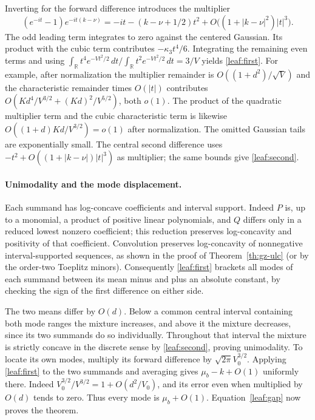 \documentclass[11pt,a4paper]{article}
\numberwithin{equation}{section}
\begin{document}
Inverting for the forward difference introduces the multiplier
\[
 (e^{-it}-1)e^{-it(k-\nu)}
 =-it-(k-\nu+1/2)t^2+O\big((1+|k-\nu|^2)|t|^3\big).
\]
The odd leading term integrates to zero against the centered
Gaussian. Its product with the cubic term contributes
$-\kappa_3t^4/6$. Integrating the remaining even terms and using
$\int_{\mathbb R}t^4 e^{-Vt^2/2}\,dt/
\int_{\mathbb R}t^2 e^{-Vt^2/2}\,dt=3/V$ yields
\eqref{leaf:first}. For example, after normalization the multiplier
remainder is $O((1+d^2)/\sqrt V)$ and the characteristic remainder
times $O(|t|)$ contributes
$O(Kd^4/V^{3/2}+(Kd)^2/V^{5/2})$, both $o(1)$.
The product of the quadratic multiplier term and the cubic
characteristic term is likewise $O((1+d)Kd/V^{3/2})=o(1)$
after normalization. The omitted Gaussian tails are exponentially small.
The central second difference uses
$-t^2+O((1+|k-\nu|)|t|^3)$ as multiplier; the same bounds give
\eqref{leaf:second}.

\paragraph{Unimodality and the mode displacement.}
Each summand has log-concave coefficients and interval support.
Indeed $P$ is, up to a monomial, a product of positive linear
polynomials, and $Q$ differs only in a reduced lowest nonzero
coefficient; this reduction preserves log-concavity and positivity
of that coefficient. Convolution preserves log-concavity of
nonnegative interval-supported sequences, as shown in the proof of
Theorem~\ref{th:gz-ulc} (or by the order-two Toeplitz minors).
Consequently \eqref{leaf:first} brackets all modes of each summand
between its mean minus and plus an absolute constant, by checking
the sign of the first difference on either side.

The two means differ by $O(d)$. Below a common central interval
containing both mode ranges the mixture increases, and above it
the mixture decreases, since its two summands do so individually.
Throughout that interval the mixture is strictly concave in the
discrete sense by \eqref{leaf:second}, proving unimodality.
To locate its own modes, multiply its forward difference by
$\sqrt{2\pi}V_0^{3/2}$. Applying \eqref{leaf:first} to the two
summands and averaging gives $\mu_b-k+O(1)$ uniformly there.
Indeed $V_0^{3/2}/V^{3/2}=1+O(d^2/V_0)$, and its error even when
multiplied by $O(d)$ tends to zero. Thus every mode is $\mu_b+O(1)$.
Equation~\eqref{leaf:gap} now proves the theorem.
\end{document}
